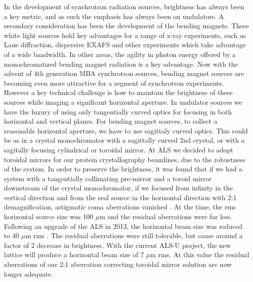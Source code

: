 \documentclass{iucr}              %
\begin{document}
In the development of synchrotron radiation sources, brightness has always been a key metric, and as such the emphasis has always been on undulators.  A secondary consideration has been the development of the bending magnets. These white light sources hold key advantages for a range of x-ray experiments, such as Laue diffraction, dispersive EXAFS and other experiments which take advantage of a wide bandwidth.  In other areas, the agility in photon energy offered by a monochromatized bending magnet radiation is a key advantage.  Now with the advent of 4th generation MBA synchrotron sources, bending magnet sources are becoming even more attractive for a segment of synchrotron experiments.  However a key technical challenge is how to maintain the brightness of these sources while imaging a significant horizontal aperture.  In undulator sources we have the luxury of using only tangentially curved optics for focusing in both horizontal and vertical planes.  For bending magnet sources, to collect a reasonable horizontal aperture, we have to use sagittaly curved optics.  This could be as in a crystal monochromator with a sagittally curved 2nd crystal, or with a sagitally focusing cylindrical or toroidal mirror.  At ALS we decided to adopt toroidal mirrors for our protein crystallography beamlines, due to the robustness of the system.  In order to preserve the brightness, it was found that if we had a system with a tangentially collimating pre-mirror and a toroid mirror downstream of the crystal monochromator, if we focused from infinity in the vertical direction and from the real source in the horizontal direction with 2:1 demagnification,  astigmatic coma aberrations vanished \cite{MacDowell2004}. At the time, the rms horizontal source size was 100 $\mu$m and the residual aberrations were far less.  Following an upgrade of the ALS in 2013, the horizontal beam size was reduced to 40 $\mu$m  rms \cite{Steier_2014}. The residual aberrations were still tolerable, but cause around a factor of 2 decrease in brightness.  With the current ALS-U project, the new lattice will produce a horizontal beam size of 7 $\mu$m rms.  At this value the residual aberrations of our 2:1 aberration correcting toroidal mirror solution are now longer adequate.
\end{document}
